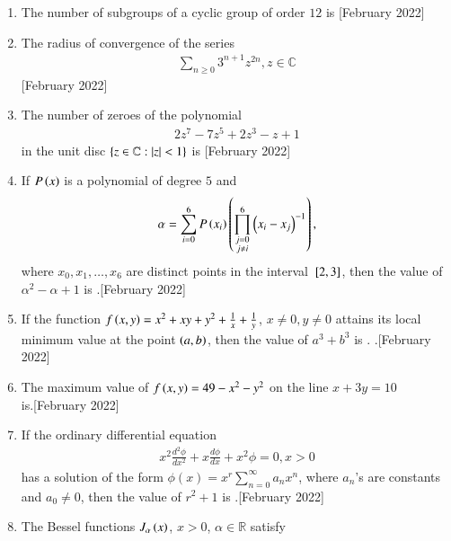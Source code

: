 \documentclass[journal]{IEEEtran}
\begin{document}
\begin{enumerate}
   \item The number of subgroups of a cyclic group of order $12$ is \underline{\hspace{1cm}} \hfill[February 2022]
   \item The radius of convergence of the series 
   \begin{align}
       \sum_{n \ge 0} 3^{n+1} z^{2n}, z \in \mathbb{C}
\end{align}\hfill[February 2022]
\item The number of zeroes of the polynomial 
\begin{align}
    2z^7-7z^5+2z^3-z+1
\end{align} 
in the unit disc $\left\{z \in \mathbb{C} : \left\vert z\right\vert<1\right\}$ is \underline{\hspace{2cm}} \hfill[February 2022]
\item If $P\left(x\right)$ is a polynomial of degree $5$ and
\begin{align}
\alpha = \sum_{i=0}^6 P\left(x_i\right) \left( \prod_{\substack{j=0 \\ j \neq i}}^6 \left(x_i - x_j\right)^{-1}\right),
\end{align}
where $x_0, x_1, \dots, x_6$ are distinct points in the interval ${}\left[2,3\right]$, then the value of $\alpha^2 - \alpha + 1$ is \underline{\hspace{2cm}}.\hfill[February 2022] 
\item If the function $f\left(x, y\right) = x^2 + xy + y^2 + \frac{1}{x} + \frac{1}{y}$, $x \neq 0, y \neq 0$ attains its local minimum value at the point $\left(a, b\right)$, then the value of $a^3 + b^3$ is \underline{\hspace{2cm}}. .\hfill[February 2022] 
\item The maximum value of $f\left(x, y\right) = 49-x^2-y^2$ on the line $x+3y = 10$ \\is\underline{\hspace{2cm}}.\hfill[February 2022]
\item If the ordinary differential equation
\begin{align}
x^2 \frac{d^2 \phi}{dx^2} + x \frac{d \phi}{dx} + x^2 \phi = 0, x > 0
\end{align}
has a solution of the form 
$\phi(x) = x^r \sum_{n=0}^{\infty} a_n x^n$,
where $a_n$'s are constants and $a_0 \neq 0$, then the value of $r^2 + 1$ is \underline{\hspace{2cm}}.\hfill[February 2022] 
\item The Bessel functions $J_\alpha\left(x\right)$, $x > 0$, $\alpha \in \mathbb{R}$ satisfy

\end{enumerate}
\end{document}
